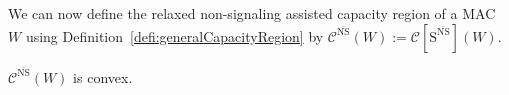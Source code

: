 
  We can now define the relaxed non-signaling assisted capacity region of a MAC $W$ using Definition~\ref{defi:generalCapacityRegion} by $\mathcal{C}^{\overline{\mathrm{NS}}}(W) := \mathcal{C}[\mathrm{S}^{\overline{\mathrm{NS}}}](W)$.

  \begin{proposition}
     $\mathcal{C}^{\overline{\mathrm{NS}}}(W)$ is convex. 
  \end{proposition}

